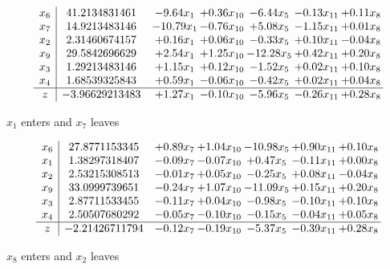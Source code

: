 \documentclass[8pt]{article}
\begin{document}
 \[\begin{array}{c| c c@{\hskip 2pt} c@{\hskip 2pt} c@{\hskip 2pt} c@{\hskip 2pt} c@{\hskip 2pt} }
 x_{6}   &  41.2134831461 & -9.64 x_{1} & +  0.36 x_{10} & -6.44 x_{5} & -0.13 x_{11} & +  0.11 x_{8}\\
 x_{7}   &  14.9213483146 & -10.79 x_{1} & -0.76 x_{10} & +  5.08 x_{5} & -1.15 x_{11} & +  0.01 x_{8}\\
 x_{2}   &  2.31460674157 & +  0.16 x_{1} & +  0.06 x_{10} & -0.33 x_{5} & +  0.10 x_{11} & -0.04 x_{8}\\
 x_{9}   &  29.5842696629 & +  2.54 x_{1} & +  1.25 x_{10} & -12.28 x_{5} & +  0.42 x_{11} & +  0.20 x_{8}\\
 x_{3}   &  1.29213483146 & +  1.15 x_{1} & +  0.12 x_{10} & -1.52 x_{5} & +  0.02 x_{11} & +  0.10 x_{8}\\
 x_{4}   &  1.68539325843 & +  0.59 x_{1} & -0.06 x_{10} & -0.42 x_{5} & +  0.02 x_{11} & +  0.04 x_{8}\\
\hline
z    &  -3.96629213483 & +  1.27 x_{1} & -0.10 x_{10} & -5.96 x_{5} & -0.26 x_{11} & +  0.28 x_{8}\\
\end{array}\]


 $ x_{1} $ enters and $ x_{7} $ leaves 

 \[\begin{array}{c| c c@{\hskip 2pt} c@{\hskip 2pt} c@{\hskip 2pt} c@{\hskip 2pt} c@{\hskip 2pt} }
 x_{6}   &  27.8771153345 & +  0.89 x_{7} & +  1.04 x_{10} & -10.98 x_{5} & +  0.90 x_{11} & +  0.10 x_{8}\\
 x_{1}   &  1.38297318407 & -0.09 x_{7} & -0.07 x_{10} & +  0.47 x_{5} & -0.11 x_{11} & +  0.00 x_{8}\\
 x_{2}   &  2.53215308513 & -0.01 x_{7} & +  0.05 x_{10} & -0.25 x_{5} & +  0.08 x_{11} & -0.04 x_{8}\\
 x_{9}   &  33.0999739651 & -0.24 x_{7} & +  1.07 x_{10} & -11.09 x_{5} & +  0.15 x_{11} & +  0.20 x_{8}\\
 x_{3}   &  2.87711533455 & -0.11 x_{7} & +  0.04 x_{10} & -0.98 x_{5} & -0.10 x_{11} & +  0.10 x_{8}\\
 x_{4}   &  2.50507680292 & -0.05 x_{7} & -0.10 x_{10} & -0.15 x_{5} & -0.04 x_{11} & +  0.05 x_{8}\\
\hline
z    &  -2.21426711794 & -0.12 x_{7} & -0.19 x_{10} & -5.37 x_{5} & -0.39 x_{11} & +  0.28 x_{8}\\
\end{array}\]


 $ x_{8} $ enters and $ x_{2} $ leaves 
\end{document}
